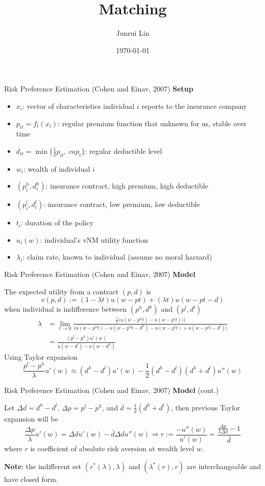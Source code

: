 \documentclass[10pt]{beamer}
\title[NYU MSQE]{Matching}
\author[Junrui Lin]{Junrui Lin}
\institute[jl12680]{NYU MSQE}
\date[\textcolor{white}{\today} ]
{\today}
\begin{document}
\frame{\titlepage}


\begin{frame}{Risk Preference Estimation (Cohen and Einav, 2007)}
\textbf{Setup}
\begin{itemize}
\item $x_i$: vector of characteristics individual $i$ reports to the insurance company
\item $p_{it} = f_t(x_i)$: regular premium function that unknown for us, stable over time
\item $d_{it} = \min\{\frac{1}{2}p_{it},\ cap_t\}$: regular deductible level
\item $w_i$: wealth of individual $i$
\item $(p_i^h,d_i^h)$: insurance contract, high premium, high deductible
\item $(p_i^l,d_i^l)$: insurance contract, low premium, low deductible
\item $t_i$: duration of the policy
\item $u_i(w)$: individual's vNM utility function
\item $\lambda_i$: claim rate, known to individual (assume no moral harzard)
\end{itemize}
\end{frame}

\begin{frame}{Risk Preference Estimation (Cohen and Einav, 2007)}
\textbf{Model}

The expected utility from a contract $(p,d)$ is
$$v(p,d):=(1-\lambda t)u(w-pt)+(\lambda t)u(w-pt-d)$$
when individual is indifference between $(p^h,d^h)$ and $(p^l,d^l)$
\begin{align*}
	\lambda &= \lim_{t\to 0}\frac{\frac{1}{t}\bigg(u(w-p^h t)-u(w-p^lt))\bigg)}{\bigg(u(w-p^h t)-u(w-p^ht-d^h)-u(w-p^lt)+u(w-p^lt-d^l)\bigg)}\\
	&=\frac{(p^l-p^h)u'(w)}{u(w-d^l)-u(w-d^h)}
\end{align*}
Using Taylor expansion 
$$\frac{p^l-p^h}{\lambda}u'(w) \approx (d^h-d^l) u'(w)-\frac{1}{2}(d^h-d^l)(d^h+d^l)u''(w)$$
\end{frame}

\begin{frame}{Risk Preference Estimation (Cohen and Einav, 2007)}
\textbf{Model} (cont.)

Let $\Delta d = d^h-d^l$, $\Delta p = p^l-p^h$, and $\bar{d} = \frac{1}{2}(d^h+d^l)$, then previous Taylor expansion will be
$$\frac{\Delta p}{\lambda}u'(w)=\Delta d u'(w)-\bar d \Delta d u''(w)\Rightarrow r:=\frac{-u''(w)}{u'(w)}=\frac{\frac{\Delta p}{\lambda\Delta d}-1}{\bar d}$$
where $r$ is coefficient of absolute risk aversion at wealth level $w$.

\bigskip
\textbf{Note}: the indifferent set $(r^*(\lambda),\lambda)$ and $(\lambda^*(r),r)$ are interchangeable and have closed form.
\end{frame}
\end{document}
